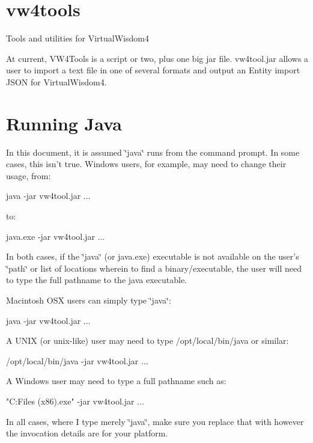 \section*{vw4tools }

Tools and utilities for Virtual\+Wisdom4

At current, V\+W4\+Tools is a script or two, plus one big jar file. vw4tool.\+jar allows a user to import a text file in one of several formats and output an Entity import J\+S\+O\+N for Virtual\+Wisdom4.

\section*{Running Java }

In this document, it is assumed \char`\"{}java\char`\"{} runs from the command prompt. In some cases, this isn't true. Windows users, for example, may need to change their usage, from\+: \begin{DoxyVerb}java -jar vw4tool.jar ...
\end{DoxyVerb}


to\+: \begin{DoxyVerb}java.exe -jar vw4tool.jar ...
\end{DoxyVerb}


In both cases, if the \char`\"{}java\char`\"{} (or java.\+exe) executable is not available on the user's \char`\"{}path\char`\"{} or list of locations wherein to find a binary/executable, the user will need to type the full pathname to the java executable.

Macintosh O\+S\+X users can simply type \char`\"{}java\char`\"{}\+: \begin{DoxyVerb}java -jar vw4tool.jar ...
\end{DoxyVerb}


A U\+N\+I\+X (or unix-\/like) user may need to type /opt/local/bin/java or similar\+: \begin{DoxyVerb}/opt/local/bin/java -jar vw4tool.jar ...
\end{DoxyVerb}


A Windows user may need to type a full pathname such as\+: \begin{DoxyVerb}"C:\Program Files (x86)\Java{}\bin\java.exe" -jar vw4tool.jar ...
\end{DoxyVerb}


In all cases, where I type merely \char`\"{}java\char`\"{}, make sure you replace that with however the invocation details are for your platform.

